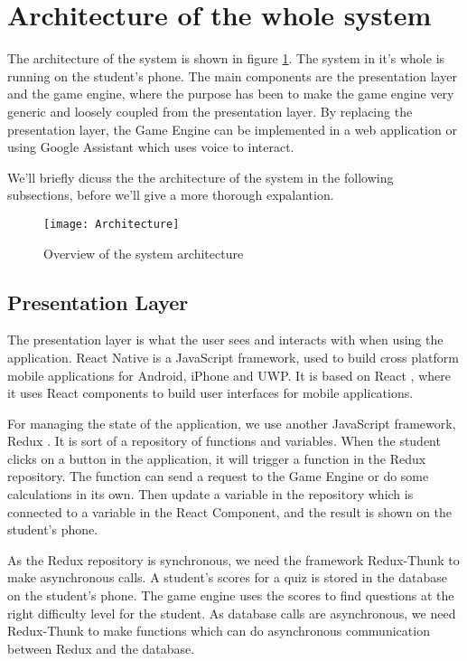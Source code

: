 \section{Architecture of the whole system}
The architecture of the system is shown in figure \ref{fig:Architecture}. The system in it's whole is running on the student's phone. The main components are the presentation layer and the game engine, where the purpose has been to make the game engine very generic and loosely coupled from the presentation layer. By replacing the presentation layer, the Game Engine can be implemented in a web application or using Google Assistant which uses voice to interact. 

We'll briefly dicuss the the architecture of the system in the following subsections, before we'll give a more thorough expalantion.

\begin{figure}[h!]
	\texttt{[image: Architecture]}
	\caption {Overview of the system architecture}
	\label{fig:Architecture}
\end{figure}

\subsection{Presentation Layer}
The presentation layer is what the user sees and interacts with when using the application. React Native \parencite{ReactNative} is a JavaScript framework, used to build cross platform mobile applications for Android, iPhone and UWP. It is based on React \parencite{React}, where it uses React components to build user interfaces for mobile applications. 

For managing the state of the application, we use another JavaScript framework, Redux \parencite{Redux}. It is sort of a repository of functions and variables. When the student clicks on a button in the application, it will trigger a function in the Redux repository. The function can send a request to the Game Engine or do some calculations in its own. Then update a variable in the repository which is connected to a variable in the React Component, and the result is shown on the student's phone.

As the Redux repository is synchronous, we need the framework Redux-Thunk \parencite{ReduxJS-thunk} to make asynchronous calls. A student's scores for a quiz is stored in the database on the student's phone. The game engine uses the scores to find questions at the right difficulty level for the student. As database calls are asynchronous, we need Redux-Thunk to make functions which can do asynchronous communication between Redux and the database. 

